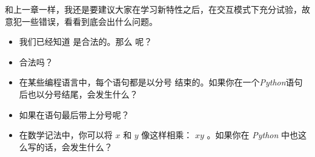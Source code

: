 \begin{exercise}









和上一章一样，我还是要建议大家在学习新特性之后，在交互模式下充分试验，故意犯一些错误，看看到底会出什么问题。

\begin{itemize}

\item 我们已经知道 {\em {}} 是合法的。那么 {\em {}} 呢？

\item {\em {}} 合法吗？

\item 在某些编程语言中，每个语句都是以分号 {\em \li{;}} 结束的。如果你在一个{\em Python}语句后也以分号结尾，会发生什么？

\item 如果在语句最后带上分号呢？

\item 在数学记法中，你可以将  $x$ 和  $y$ 像这样相乘： $x y$ 。如果你在 {\em Python} 中也这么写的话，会发生什么？

\end{itemize}

\end{exercise}


